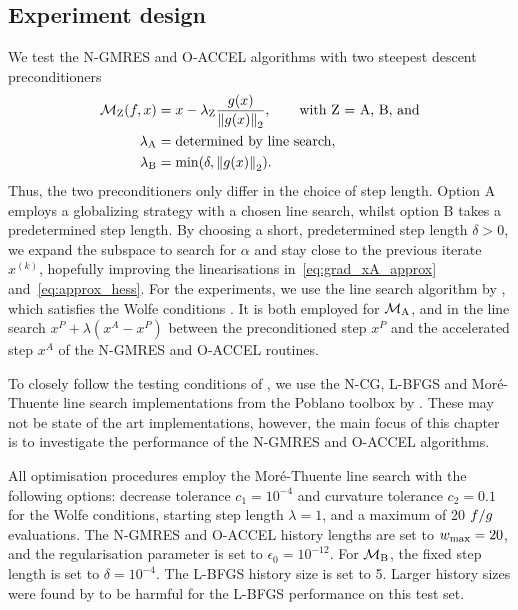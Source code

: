 \documentclass[main.tex]{subfiles}
\begin{document}
\subsection{Experiment design}\label{subsec:experiment_design}
We test the N-GMRES and O-ACCEL algorithms with two steepest descent
preconditioners
\begin{align}
  \mathcal{M}_{\text{Z}}(f,x) &= x-\lambda_{\text{Z}} \frac{g(x)}{\left\lVert g(x)\right\rVert_2}, \qquad
                               \text{with Z = A, B, and}\nonumber\\
  \lambda_{\text{A}} &= \text{determined by line search},\\
  \lambda_{\text{B}} &= \min(\delta,\left\lVert g(x)\right\rVert_2).
\end{align}
Thus, the two preconditioners only differ in the choice of step
length. Option A employs a globalizing strategy with a chosen line
search, whilst option B takes a predetermined step length.  By
choosing a short, predetermined step length $\delta>0$, we expand the
subspace to search for $\alpha$ and stay close to the previous iterate
$x^{(k)}$, hopefully improving the linearisations
in~\eqref{eq:grad_xA_approx} and~\eqref{eq:approx_hess}.  For the
experiments, we use the line search algorithm by \citet{more1994line},
which satisfies the Wolfe conditions \citep{nocedal2006numerical}.  It
is both employed for $\mathcal{M}_{\text{A}}$, and in the line search
$x^P+\lambda(x^A-x^P)$ between the preconditioned step $x^P$ and the
accelerated step $x^A$ of the N-GMRES and O-ACCEL routines.

To closely follow the testing conditions of
\citet{sterck2013steepest}, we use the N-CG, L-BFGS and
Mor\'{e}-Thuente line search implementations from the Poblano toolbox
by \citet{dunlavy2010poblano}.  These may not be state of the art
implementations, however, the main focus of this chapter is to
investigate the performance of the N-GMRES and O-ACCEL
algorithms. %

All optimisation procedures employ the Mor\'{e}-Thuente line search
with the following options: decrease tolerance $c_1=10^{-4}$ and
curvature tolerance $c_2=0.1$ for the Wolfe conditions, starting step
length $\lambda=1$, and a maximum of \num{20} $f/g$
evaluations.  The N-GMRES and O-ACCEL history lengths are set to
$w_{\textnormal{max}}=20$, and the regularisation parameter is set to
$\epsilon_0=10^{-12}$.  For $\mathcal{M}_{\text{B}}$, the fixed step
length is set to $\delta=10^{-4}$.  The L-BFGS history size is set to
\num{5}. Larger history sizes were found by \citet{sterck2013steepest}
to be harmful for the L-BFGS performance on this test set.
\end{document}
